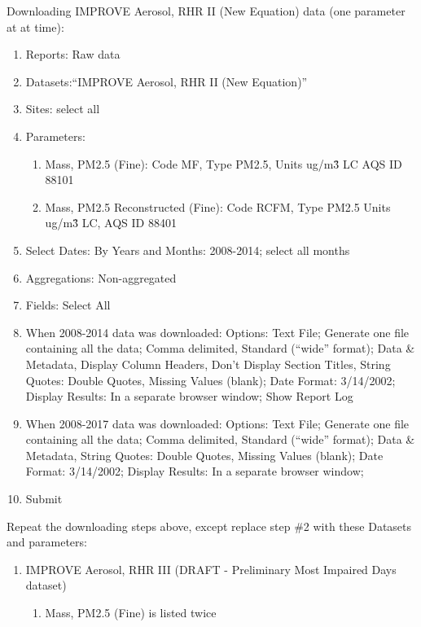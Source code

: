 \noindent Downloading IMPROVE Aerosol, RHR II (New Equation) data (one parameter at at time):
\begin{enumerate}
\item Reports: Raw data
\item Datasets:``IMPROVE Aerosol, RHR II (New Equation)''
\item Sites: select all
\item Parameters: 
  \begin{enumerate}
  \item Mass, PM2.5 (Fine): Code MF, Type PM2.5, Units ug/m\^3 LC AQS ID 88101
  \item Mass, PM2.5 Reconstructed (Fine): Code RCFM, Type PM2.5 Units ug/m\^3 LC, AQS ID 88401
  \end{enumerate}
\item Select Dates: By Years and Months: 2008-2014; select all months
\item Aggregations: Non-aggregated
\item Fields: Select All
\item When 2008-2014 data was downloaded: Options: Text File; Generate one file containing all the data; Comma delimited, Standard (``wide'' format); Data \& Metadata, Display Column Headers, Don't Display Section Titles, String Quotes: Double Quotes, Missing Values (blank); Date Format: 3/14/2002; Display Results: In a separate browser window; Show Report Log
\item When 2008-2017 data was downloaded: Options: Text File; Generate one file containing all the data; Comma delimited, Standard (``wide'' format); Data \& Metadata, %
String Quotes: Double Quotes, Missing Values (blank); Date Format: 3/14/2002; Display Results: In a separate browser window; %

\item Submit
\end{enumerate}

Repeat the downloading steps above, except replace step \#2 with these Datasets and parameters:
\begin{enumerate}
\item IMPROVE Aerosol, RHR III (DRAFT - Preliminary Most Impaired Days dataset) 
	\begin{enumerate}
	\item Mass, PM2.5 (Fine) is listed twice %
	\end{enumerate}
\end{enumerate}


